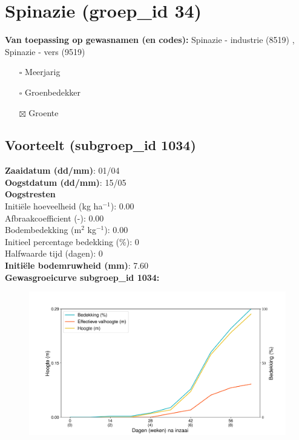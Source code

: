 \documentclass{article}
\begin{document}
 \section{Spinazie (groep\_id 34)} 
 \textbf{Van toepassing op gewasnamen (en codes):} Spinazie - industrie (8519) , Spinazie - vers (9519) 
 \begin{multicols}{3} \begin{itemize} \item[$\square$] Meerjarig \item[$\square$] Groenbedekker \item[$\boxtimes$] Groente \end{itemize} \end{multicols} 
 \subsection{Voorteelt (subgroep\_id 1034)} 
  \textbf{Zaaidatum (dd/mm)}: 01/04  \vspace{0.10cm} \\ 
  \textbf{Oogstdatum (dd/mm)}: 15/05  \vspace{0.10cm} \\ 
  \textbf{Oogstresten} \vspace{0.05cm} \\ 
  \tab Initi\"{e}le hoeveelheid (kg ha$^{-1}$): 0.00 \vspace{0.05cm} \\ 
  \tab Afbraakcoefficient (-): 0.00 \vspace{0.05cm} \\ 
  \tab Bodembedekking (m$^2$ kg$^{-1}$): 0.00 \vspace{0.05cm} \\ 
  \tab Initieel percentage bedekking (\%): 0 \vspace{0.05cm} \\ 
  \tab Halfwaarde tijd (dagen): 0 \vspace{0.05cm} \\ 
  \textbf{Initi\"{e}le bodemruwheid (mm)}: 7.60 \vspace{0.05cm} \\ 
  \textbf{Gewasgroeicurve subgroep\_id 1034:} 
 \begin{center} \begin{figure}[H] \includegraphics[width=12.5cm]{temp/1034.png} \end{figure} \end{center} 
\end{document}

